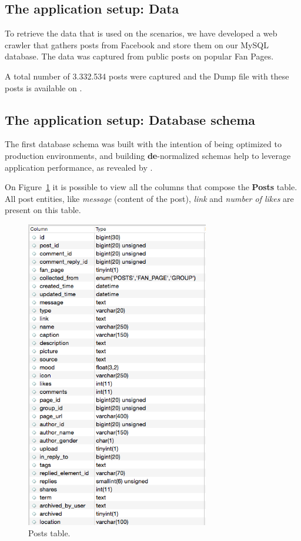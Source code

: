 \subsection{The application setup: Data}
To retrieve the data that is used on the scenarios, we have developed a web crawler that gathers posts from Facebook and store them on our MySQL database. The data was captured from public posts on popular Fan Pages.

A total number of 3.332.534 posts were captured and the Dump file with these posts is available on \cite{dump}. 

\subsection{The application setup: Database schema}
\label{database_schema_section}
The first database schema was built with the intention of being optimized to production environments, and building \textbf{de}-normalized schemas help to leverage application performance, as revealed by \cite{926306}. 

On Figure~\ref{fig:postsTable} it is possible to view all the columns that compose the \textbf{Posts} table. All post entities, like \textit{message} (content of the post), \textit{link} and \textit{number of likes} are present on this table. 

\begin{figure}[ht!]
\centering
\includegraphics[width=80mm]{postTable.png}
\caption{Posts table.\label{fig:postsTable}}
\end{figure}

